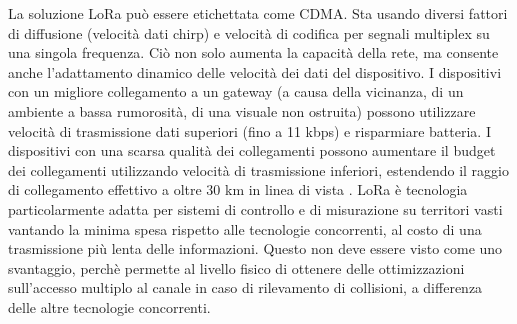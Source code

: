 \documentclass[a4paper]{report} %
\begin{document}
La soluzione LoRa può essere etichettata come CDMA. Sta usando diversi fattori di diffusione (velocità dati chirp) e velocità di codifica per segnali multiplex su una singola frequenza. Ciò non solo aumenta la capacità della rete, ma consente anche l'adattamento dinamico delle velocità dei dati del dispositivo. I dispositivi con un migliore collegamento a un gateway (a causa della vicinanza, di un ambiente a bassa rumorosità, di una visuale non ostruita) possono utilizzare velocità di trasmissione dati superiori (fino a 11 kbps) e risparmiare batteria. I dispositivi con una scarsa qualità dei collegamenti possono aumentare il budget dei collegamenti utilizzando velocità di trasmissione inferiori, estendendo il raggio di collegamento effettivo a oltre 30 km in linea di vista \cite{art:rif.30}. 
LoRa è tecnologia particolarmente adatta per sistemi di controllo e di misurazione su territori vasti vantando la minima spesa rispetto alle tecnologie concorrenti, al costo di una trasmissione più lenta delle informazioni. Questo non deve essere visto come uno svantaggio, perchè permette al livello fisico di ottenere delle ottimizzazioni sull'accesso multiplo al canale in caso di rilevamento di collisioni, a differenza delle altre tecnologie concorrenti.
\end{document}
